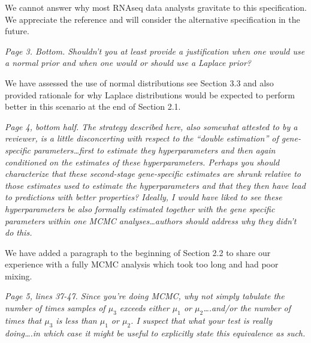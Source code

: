 \documentclass{article}
\newcommand{\comment}[1]{\textit{#1}}
\newcommand{\response}[1]{#1}
\begin{document}
\response{We cannot answer why most RNAseq data analysts gravitate to this specification. We appreciate the reference and will consider the alternative specification in the future.}

\comment{Page 3. Bottom.  Shouldn’t you at least provide a justification when one would use a normal prior and when one would or should use a Laplace prior?}

\response{We have assessed the use of normal distributions see Section 3.3 and also provided rationale for why Laplace distributions would be expected to perform better in this scenario at the end of Section 2.1.}

\comment{Page 4, bottom half.  The strategy described here, also somewhat attested to by a reviewer, is a little disconcerting with respect to the “double estimation” of gene-specific parameters…first to estimate they hyperparameters and then again conditioned on the estimates of these hyperparameters.  Perhaps you should characterize that these second-stage gene-specific estimates are shrunk relative to those estimates used to estimate the hyperparameters and that they then have lead to predictions with better properties?  Ideally, I would have liked to see these hyperparameters be also formally estimated together with the gene specific parameters within one MCMC analyses…authors should address why they didn’t do this.}

\response{We have added a paragraph to the beginning of Section 2.2 to share our experience with a fully MCMC analysis which took too long and had poor mixing.}

\comment{Page 5, lines 37-47.  Since you’re doing MCMC, why not simply tabulate the number of times samples of $\mu_3$ exceeds either $\mu_1$ or $\mu_2$….and/or the number of times that $\mu_3$ is less than $\mu_1$ or $\mu_2$.  I suspect that what your test is really doing….in which case it might be useful to explicitly state this equivalence as such.}
\end{document}
